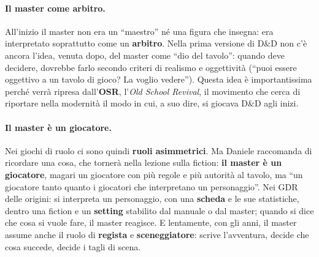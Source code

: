 \paragraph{Il master come arbitro.} All'inizio il master non era un ``maestro''
né una figura che insegna: era interpretato soprattutto come un
\textbf{arbitro}. Nella prima versione di D\&D non c'è ancora l'idea, venuta
dopo, del master come ``dio del tavolo'': quando deve decidere, dovrebbe farlo
secondo criteri di realismo e oggettività (``puoi essere oggettivo a un tavolo
di gioco? La voglio vedere''). Questa idea è importantissima perché verrà ripresa
dall'\textbf{OSR}, l'\emph{Old School Revival}, il movimento che cerca di
riportare nella modernità il modo in cui, a suo dire, si giocava D\&D agli
inizi.

\paragraph{Il master è un giocatore.} Nei giochi di ruolo ci sono quindi
\textbf{ruoli asimmetrici}. Ma Daniele raccomanda di ricordare una cosa, che
tornerà nella lezione sulla fiction: \textbf{il master è un giocatore}, magari un
giocatore con più regole e più autorità al tavolo, ma ``un giocatore tanto quanto
i giocatori che interpretano un personaggio''. Nei GDR delle origini: si
interpreta un personaggio, con una \textbf{scheda} e le sue statistiche, dentro
una fiction e un \textbf{setting} stabilito dal manuale o dal master; quando si
dice che cosa si vuole fare, il master reagisce. E lentamente, con gli anni, il
master assume anche il ruolo di \textbf{regista} e \textbf{sceneggiatore}: scrive
l'avventura, decide che cosa succede, decide i tagli di scena.

